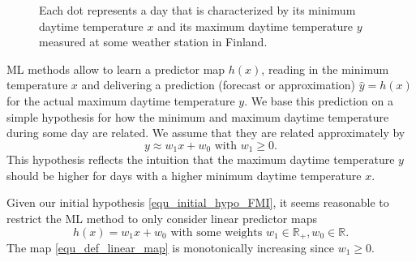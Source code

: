 \documentclass[12pt]{report}
\begin{document}
\begin{figure}[htbp]
	\begin{center}
		\vspace*{-14mm}
	\end{center}
	\caption{Each dot represents a day that is characterized 
		by its minimum daytime temperature $x$ and its maximum 
		daytime temperature $y$ measured at some weather station in 
		Finland.}
	\label{fig_scatterplot_temp_FMI}
	\vspace*{-3mm}
\end{figure}

ML methods allow to learn a predictor map $h(x)$, reading in 
the minimum temperature $x$ and delivering a prediction (forecast or approximation) 
$\hat{y} = h(x)$ for the actual maximum daytime temperature $y$. 
We base this prediction on a simple hypothesis for how the minimum 
and maximum daytime temperature during some day are related. 
We assume that they are related approximately by 
\begin{equation}
\label{equ_initial_hypo_FMI}
y \approx w_{1} x + w_{0} \mbox{ with } w_{1} \geq 0. 
\end{equation}
This hypothesis reflects the intuition that the maximum daytime temperature 
$y$ should be higher for days with a higher minimum daytime temperature $x$. 

Given our initial hypothesis \eqref{equ_initial_hypo_FMI}, it seems reasonable 
to restrict the ML method to only consider linear predictor maps
\begin{equation} 
\label{equ_def_linear_map}
h(x) = w_{1} x + w_{0} \mbox{ with some weights } w_{1} \in \mathbb{R}_{+},w_{0} \in \mathbb{R}. 
\end{equation}
The map \eqref{equ_def_linear_map} is monotonically increasing since $w_{1}\!\geq\!0$. 
\end{document}
